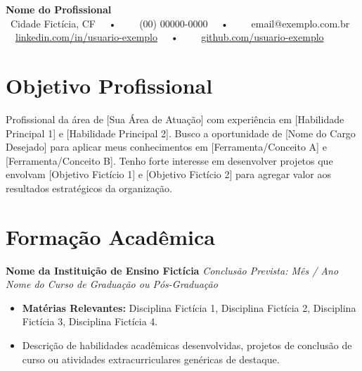 \documentclass[11pt,a4paper]{article}
\begin{document}
\pagestyle{empty}

\begin{center}
    {\LARGE \textbf{Nome do Profissional}} \\ \vspace{3pt}
    \faMapMarker \ Cidade Fict\'icia, CF \ \ • \ \ \faPhone \ \ (00) 00000-0000 \ \ • \ \ \faEnvelope \ \ email@exemplo.com.br \\ \vspace{2pt}
    \faLinkedin\ \ \href {https://linkedin.com/in/usuario-exemplo} {linkedin.com/in/usuario-exemplo} \ \ • \ \ \faGithub \ \ \href{https://github.com/usuario-exemplo}{github.com/usuario-exemplo}
\end{center}

\section*{Objetivo Profissional}
\vspace{6pt}
Profissional da \'area de [Sua \'Area de Atua\c{c}\~ao] com experi\^encia em [Habilidade Principal 1] e [Habilidade Principal 2]. Busco a oportunidade de [Nome do Cargo Desejado] para aplicar meus conhecimentos em [Ferramenta/Conceito A] e [Ferramenta/Conceito B]. Tenho forte interesse em desenvolver projetos que envolvam [Objetivo Fict\'icio 1] e [Objetivo Fict\'icio 2] para agregar valor aos resultados estrat\'egicos da organiza\c{c}\~ao.

\section*{Forma\c{c}\~ao Acad\^emica}
\vspace{6pt}
\noindent
\textbf{Nome da Institui\c{c}\~ao de Ensino Fict\'icia} \hfill \textit{Conclus\~ao Prevista: M\^es / Ano} \\
\textit{Nome do Curso de Gradua\c{c}\~ao ou P\'os-Gradua\c{c}\~ao}
\begin{itemize}[leftmargin=*, noitemsep, topsep=2pt]
    \item \textbf{Mat\'erias Relevantes:} Disciplina Fict\'icia 1, Disciplina Fict\'icia 2, Disciplina Fict\'icia 3, Disciplina Fict\'icia 4.
    \item Descri\c{c}\~ao de habilidades acad\^emicas desenvolvidas, projetos de conclus\~ao de curso ou atividades extracurriculares gen\'ericas de destaque.
\end{itemize}
\end{document}
